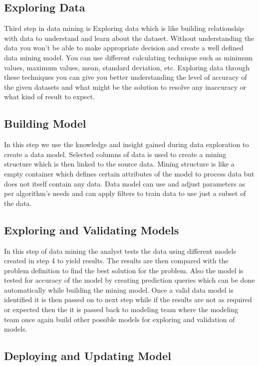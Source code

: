 \documentclass{article}
\begin{document}
\subsection{Exploring Data}\label{concept}

Third step in data mining is Exploring data which is like building relationship with data to understand and learn about the dataset. Without understanding the data you won’t be able to  make appropriate decision and create a well defined data mining model. You can use different calculating technique such as minimum values, maximum values, mean, standard deviation, etc. Exploring data through these techniques you can give you better understanding the level of accuracy of the given datasets and what might be the solution to resolve any inaccuracy or what kind of result to expect.

\subsection{Building Model}\label{concept}

In this step we use the knowledge and insight gained during data exploration to create a data model. Selected columns of data is used to create a mining structure which is then linked to the source data. Mining structure is like a empty container which defines certain attributes of the model to process data but does not itself contain any data. Data model can use and adjust parameters as per algorithm’s needs and can apply filters to train data to use just a subset of the data.

\subsection{Exploring and Validating Models}\label{concept}

In this step of data mining the analyst tests the data using different models created in step 4 to yield results. The results are then compared with the problem definition to find the best solution for the problem. Also the model is tested for accuracy of the model by creating prediction queries which can be done automatically while building the mining model. Once a valid data model is identified it is then passed on to next step while if the results are not as required or expected then the it is passed back to modeling team where the modeling team once again build other possible models for exploring and validation of models.

\subsection{Deploying and Updating Model}\label{concept}
\end{document}

